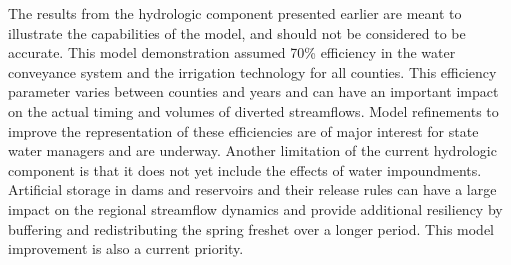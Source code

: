  The results from the hydrologic component presented earlier are meant to illustrate the capabilities of the model, and should not be considered to be accurate. This model demonstration assumed 70\% efficiency in the water conveyance system and the irrigation technology for all counties. This efficiency parameter varies between counties and years and can have an important impact on the actual timing and volumes of diverted streamflows. Model refinements to improve the representation of these efficiencies are of major interest for state water managers and are underway. Another limitation of the current hydrologic component is that it does not yet include the effects of water impoundments. Artificial storage in dams and reservoirs and their release rules can have a large impact on the regional streamflow dynamics and provide additional resiliency by buffering and redistributing the spring freshet over a longer period. This model improvement is also a current priority.     

 